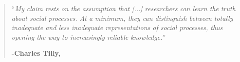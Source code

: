 

\begin{quote}
    ``\textit{My claim rests on the assumption that [...] researchers can learn the truth about social processes. At a minimum, they can distinguish between totally inadequate and less inadequate representations of social processes, thus opening the way to increasingly reliable knowledge.''} \vspace{-10pt}
\begin{flushright}
    \textbf{-Charles Tilly, \cite{tillyObservationsSocialProcesses2004}}
\end{flushright}
\end{quote}



